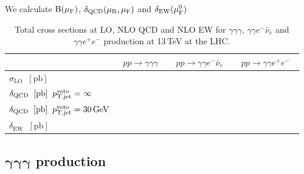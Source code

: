 We calculate $\mathrm{B}(\mu_{\mathrm{F}})$, $\delta_\text{QCD}(\mu_{\mathrm{R}},\mu_{\mathrm{F}})$ and 
$\delta_\text{EW}(\mu_{\mathrm{F}}^0)$

\begin{table}[h!]
  \centering
  \begin{tabular}{l||c|c|c}
      & $\;\;pp \to \gamma \gamma\gamma\;\;$
      & $\;\;pp \to \gamma \gamma e^-\bar\nu_e\;\;$ 
      & $\;\;pp \to \gamma \gamma e^+e^-\;\;$ \\
    \hline\hline
    $\sigma_\text{LO}\;\;[\text{pb}] $ &  &  & \\
    \hline
    $\delta_\text{QCD}\;\;[\text{pb}]\;\;p_\text{T,jet}^\text{veto}=\infty $ &  &  & \\
    \hline
    $\delta_\text{QCD}\;\;[\text{pb}]\;\;p_\text{T,jet}^\text{veto}=30\,\text{GeV} $ &  &  & \\
    \hline
    $\delta_\text{EW}\;\;[\text{pb}] $ &  &  & \\
  \end{tabular}
  \caption{
    Total cross sections at LO, NLO QCD and NLO EW for $\gamma\gamma\gamma$, 
    $\gamma\gamma e^-\bar\nu_e$ and $\gamma\gamma e^+e^-$
    production at 13\,TeV at the LHC.
    \label{tab:xsec}
  } 
\end{table}


\subsection{\texorpdfstring{$\boldsymbol{\gamma\gamma\gamma}$}{aaa} production}
\label{sec:results:aaa}

